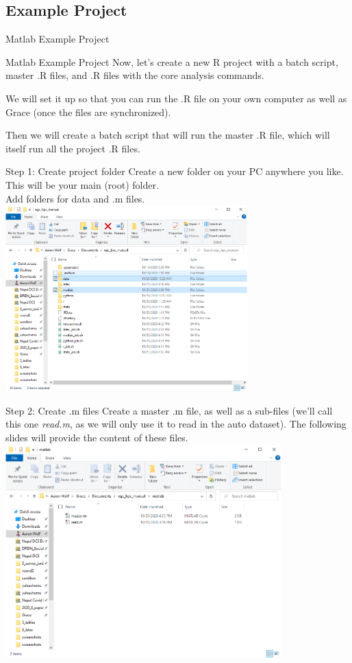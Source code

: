 \documentclass[10pt,xcolor={svgnames}]{beamer}
\begin{document}
\subsection{Example Project}
\begin{frame}[standout]
  Matlab Example Project
\end{frame}

\begin{frame}{Matlab Example Project}
Now, let's create a new R project with a batch script, master .R files, and .R files with the core analysis commands.

We will set it up so that you can run the .R file on your own computer as well as Grace (once the files are synchronized).

Then we will create a batch script that will run the master .R file, which will itself run all the project .R files.
\end{frame}

\begin{frame}{Step 1: Create project folder}
\center
Create a new folder on your PC anywhere you like. This will be your main (root) folder. \\ Add folders for data and .m files.
\includegraphics[width=0.7\textwidth]{screenshots/fig15a.PNG} 
\end{frame}

\begin{frame}{Step 2: Create .m files}
\center
Create a master .m file, as well as a sub-files (we'll call this one \textit{read.m}, as we will only use it to read in the auto dataset). The following slides will provide the content of these files.
\includegraphics[width=0.8\textwidth]{screenshots/fig15b.PNG} 
\end{frame}
\end{document}
